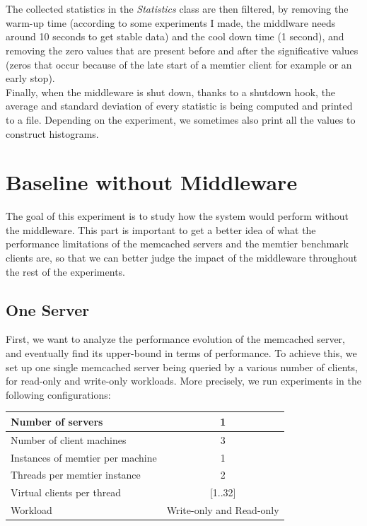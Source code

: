 \documentclass[11pt,a4paper]{article}
\begin{document}
\\\\
The collected statistics in the \textit{Statistics} class are then filtered, by removing the warm-up time (according to some experiments I made, the middlware needs around 10 seconds to get stable data) and the cool down time (1 second), and removing the zero values that are present before and after the significative values (zeros that occur because of the late start of a memtier client for example or an early stop). 
\\
Finally, when the middleware is shut down, thanks to a shutdown hook, the average and standard deviation of every statistic is being computed and printed to a file. Depending on the experiment, we sometimes also print all the values to construct histograms.
\newpage  
\section{Baseline without Middleware}
The goal of this experiment is to study how the system would perform without the middleware. This part is important to get a better idea of what the performance limitations of the memcached servers and the memtier benchmark clients are, so that we can better judge the impact of the middleware throughout the rest of the experiments. 

\subsection{One Server}

First, we want to analyze the performance evolution of the memcached server, and eventually find its upper-bound in terms of performance. To achieve this, we set up one single memcached server being queried by a various number of clients, for read-only and write-only workloads. More precisely, we run experiments in the following configurations:
\begin{center}
	\scriptsize{
		\begin{tabular}{|l|c|}
			\hline Number of servers                & 1                        \\ 
			\hline Number of client machines        & 3                        \\ 
			\hline Instances of memtier per machine & 1                        \\ 
			\hline Threads per memtier instance     & 2                        \\
			\hline Virtual clients per thread       & [1..32]                  \\ 
			\hline Workload                         & Write-only and Read-only \\
			\hline 
		\end{tabular}
	} 
\end{center}
\end{document}
